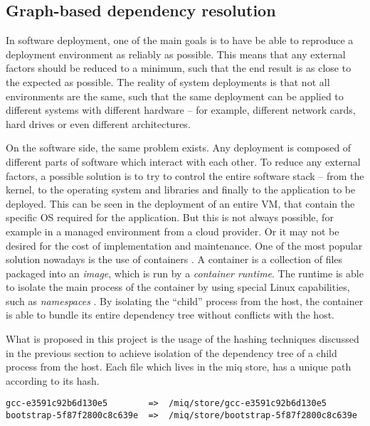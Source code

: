 \FloatBarrier
\subsection{Graph-based dependency resolution}

In software deployment, one of the main goals is to have be
able to reproduce a deployment environment as reliably as
possible. This means that any external factors should be
reduced to a minimum, such that the end result is as close
to the expected as possible. The reality of system
deployments is that not all environments are the same, such
that the same deployment can be applied to different systems
with different hardware -- for example, different network
cards, hard drives or even different architectures.

On the software side, the same problem exists. Any
deployment is composed of different parts of software which
interact with each other. To reduce any external factors,
a possible solution is to try to control the entire software
stack -- from the kernel, to the operating system and
libraries and finally to the application to be deployed.
This can be seen in the deployment of an entire \ac{VM}, that
contain the specific OS required for the application. But
this is not always possible, for example in a managed
environment from a cloud provider. Or it may not be desired
for the cost of implementation and maintenance. One of the
most popular solution nowadays is the use of containers
\cite{DockerAcceleratedContainerized2022}. A container is a
collection of files packaged into an \textit{image}, which is
run by a \textit{container runtime}. The runtime is able to
isolate the main process of the container by using special
Linux capabilities, such as \textit{namespaces}
\cite{NamespacesLinuxManualb}. By isolating the ``child''
process from the host, the container is able to bundle its
entire dependency tree without conflicts with the host.

What is proposed in this project is the usage of the hashing
techniques discussed in the previous section to achieve
isolation of the dependency tree of a child process from the
host. Each file which lives in the miq store, has a unique
path according to its hash.

\begin{verbatim}
gcc-e3591c92b6d130e5        =>  /miq/store/gcc-e3591c92b6d130e5
bootstrap-5f87f2800c8c639e  =>  /miq/store/bootstrap-5f87f2800c8c639e
\end{verbatim}

